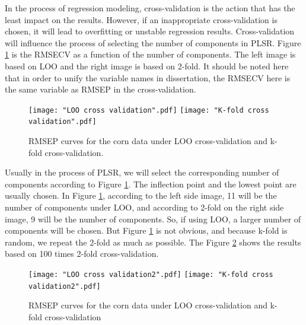 \documentclass[a4paper,12pt,titlepage]{article} %
\numberwithin{equation}{section}  %
\begin{document}
	In the process of regression modeling, cross-validation is the action that has the least impact on the results. However, if an inappropriate cross-validation is chosen, it will lead to overfitting or unstable regression results. Cross-validation will influence the process of selecting the number of components in PLSR. Figure \ref{fig:Cross-validation-1} is the RMSECV as a function of the number of components. The left image is based on LOO and the right image is based on 2-fold. It should be noted here that in order to unify the variable names in dissertation, the RMSECV here is the same variable as RMSEP in the cross-validation. 
	
		\begin{figure}[h]    %
		\centering           %
		\texttt{[image: "LOO cross validation".pdf]}  %
		\texttt{[image: "K-fold cross validation".pdf]}  %
		\caption{RMSEP curves for the corn data under LOO cross-validation  and k-fold cross-validation.}          %
		\label{fig:Cross-validation-1}               %
	\end{figure}                        %
	
	Usually in the process of PLSR, we will select the corresponding number of components according to Figure \ref{fig:Cross-validation-1}. The inflection point and the lowest point are usually chosen. In Figure \ref{fig:Cross-validation-1}, according to the left side image, 11 will be the number of components under LOO, and according to 2-fold on the right side image, 9 will be the number of components. So, if using LOO, a larger number of components will be chosen. But Figure \ref{fig:Cross-validation-1} is not obvious, and because k-fold is random, we repeat the 2-fold as much as possible. The Figure \ref{fig:Cross-validation-2} shows the results based on 100 times 2-fold cross-validation. 
	
	
	
	
			\begin{figure}[h]    %
		\centering           %
		\texttt{[image: "LOO cross validation2".pdf]}  %
		\texttt{[image: "K-fold cross validation2".pdf]}  %
		\caption{RMSEP curves for the corn data under LOO cross-validation  and k-fold cross-validation}          %
		\label{fig:Cross-validation-2}               %
	\end{figure}                        %
	
\end{document}
